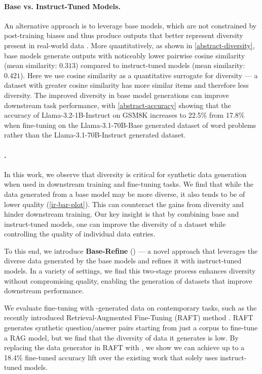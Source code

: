 \paragraph{Base vs. Instruct-Tuned Models.} An alternative approach is to leverage base models, which are not constrained by post-training biases and thus produce outputs that better represent diversity present in real-world data \cite{openai2024gpt4technicalreport}.
More quantitatively, as shown in \cref{abstract-diversity}, base models generate outputs with noticeably lower pairwise cosine similarity (mean similarity: $0.313$) compared to instruct-tuned models (mean similarity: $0.421$). Here we use cosine similarity as a quantitative surrogate for diversity --- a dataset with greater cosine similarity has more similar items and therefore less diversity. The improved diversity in base model generations can improve downstream task performance, with \cref{abstract-accuracy} showing that the accuracy of Llama-3.2-1B-Instruct on GSM8K increases to 22.5\% from 17.8\% when fine-tuning on the Llama-3.1-70B-Base generated dataset of word problems rather than the Llama-3.1-70B-Instruct generated dataset.

\paragraph{\Sys{}.} In this work, we observe that diversity is critical for synthetic data generation when used in downstream training and fine-tuning tasks. We find that while the data generated from a base model may be more diverse, it also tends to be of lower quality (\cref{ir-bar-plot}). This can counteract the gains from diversity and hinder downstream training. Our key insight is that by combining base and instruct-tuned models, one can improve the diversity of a dataset while controlling the quality of individual data entries.

To this end, we introduce \textbf{Base-Refine} (\Sys{}) --- a novel approach that leverages the diverse data generated by the base models and refines it with instruct-tuned models. In a variety of settings, we find this two-stage process enhances diversity without compromising quality, enabling the generation of datasets that improve downstream performance.

We evaluate fine-tuning with \Sys{}-generated data on contemporary tasks, such as the recently introduced Retrieval-Augmented Fine-Tuning (RAFT) method \cite{zhang2024raftadaptinglanguagemodel}. RAFT generates synthetic question/answer pairs starting from just a corpus to fine-tune a RAG model, but we find that the diversity of data it generates is low. By replacing the data generator in RAFT with \Sys{}, we show we can achieve up to a 18.4\% fine-tuned accuracy lift over the existing work that solely uses instruct-tuned models.

